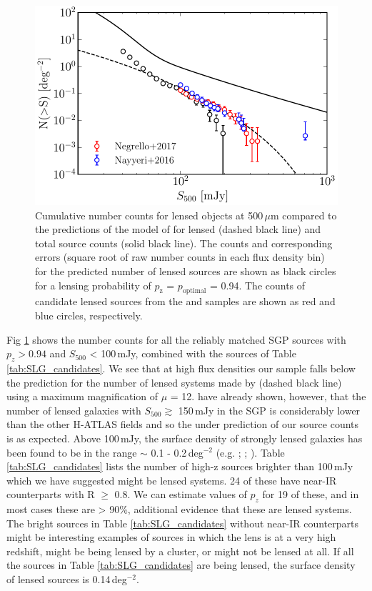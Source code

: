 \documentclass[fleqn,usenatbib]{mnras}
\begin{document}
\begin{figure}
	\includegraphics[width=\columnwidth]{Fig_11}
	\caption{Cumulative number counts for lensed objects at 500\,$\mu$m compared to the predictions of the model of \protect\cite{Cai_2013} for lensed (dashed black line) and total source counts (solid black line). The counts and corresponding errors (square root of raw number counts in each flux density bin) for the predicted number of lensed sources are shown as black circles for a lensing probability of $p_{\textrm{z}}$ = $p_{\textrm{optimal}}$ = 0.94. The counts of candidate lensed sources from the \protect\citealt{Negrello_2007} and \protect\citealt{Nayyeri_2016} samples are shown as red and blue circles, respectively.} 
	\label{fig:lensed_number_counts}
\end{figure}


Fig \ref{fig:lensed_number_counts} shows the number counts for all the reliably matched SGP sources with $p_z > 0.94$ and $S_{500}$ < 100\,mJy, combined with the sources of Table \ref{tab:SLG_candidates}. We see that at high flux densities our sample falls below the prediction for the number of lensed systems made by \citealt{Cai_2013} (dashed black line) using a maximum magnification of $\mu$ = 12. \citealt{Negrello_2017} have already shown, however, that the number of lensed galaxies with $S_{500} \gtrsim$ 150\,mJy in the SGP is considerably lower than the other H-ATLAS fields and so the under prediction of our source counts is as expected. Above 100\,mJy, the surface density of strongly lensed galaxies has been found to be in the range $\sim$ 0.1 - 0.2\,deg$^{-2}$ (e.g. \citealt{Vieira_2010}; \citealt{Wardlow_2013}; \citealt{Nayyeri_2016}). Table \ref{tab:SLG_candidates} lists the number of high-z sources brighter than 100\,mJy which we have suggested might be lensed systems. 24 of these have near-IR counterparts with R $\geq$ 0.8. We can estimate values of $p_z$ for 19 of these, and in most cases these are > 90\%, additional evidence that these are lensed systems. The bright sources in Table \ref{tab:SLG_candidates} without near-IR counterparts might be interesting examples of sources in which the lens is at a very high redshift, might be being lensed by a cluster, or might not be lensed at all. If all the sources in Table \ref{tab:SLG_candidates} are being lensed, the surface density of lensed sources is 0.14\,deg$^{-2}$.
\end{document}

